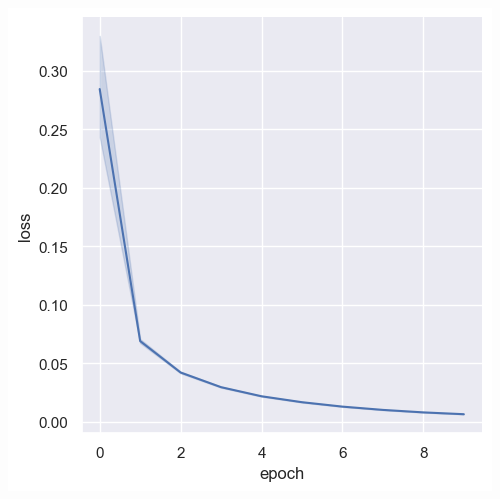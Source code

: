 \documentclass[a4paper, 11pt]{article}
\begin{document}
\begin{center}
\includegraphics[width=.9\linewidth]{./.ob-jupyter/863a672f33b571c6e5559996a193f87419c30391.png}
\end{center}
\end{document}
